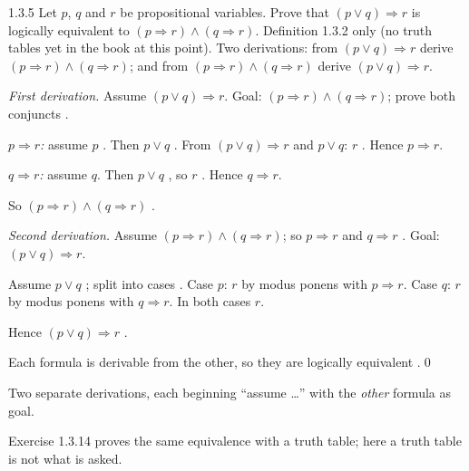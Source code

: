 \begin{bookex}[essential]{1.3.5}
Let $p$, $q$ and $r$ be propositional variables. Prove that $(p\vee q)\Rightarrow r$ is logically equivalent to $(p\Rightarrow r)\wedge(q\Rightarrow r)$.
\solution
\given Definition 1.3.2 only (no truth tables yet in the book at this point).
\goal Two derivations: from $(p\vee q)\Rightarrow r$ derive $(p\Rightarrow r)\wedge(q\Rightarrow r)$; and from $(p\Rightarrow r)\wedge(q\Rightarrow r)$ derive $(p\vee q)\Rightarrow r$.
\begin{steps}
\item \emph{First derivation.} Assume $(p\vee q)\Rightarrow r$. Goal: $(p\Rightarrow r)\wedge(q\Rightarrow r)$; prove both conjuncts .
\item \emph{$p\Rightarrow r$:} assume $p$ . Then $p\vee q$ . From $(p\vee q)\Rightarrow r$ and $p\vee q$: $r$ . Hence $p\Rightarrow r$.
\item \emph{$q\Rightarrow r$:} assume $q$. Then $p\vee q$ , so $r$ . Hence $q\Rightarrow r$.
\item So $(p\Rightarrow r)\wedge(q\Rightarrow r)$ .
\item \emph{Second derivation.} Assume $(p\Rightarrow r)\wedge(q\Rightarrow r)$; so $p\Rightarrow r$ and $q\Rightarrow r$ . Goal: $(p\vee q)\Rightarrow r$.
\item Assume $p\vee q$ ; split into cases . Case $p$: $r$ by modus ponens with $p\Rightarrow r$. Case $q$: $r$ by modus ponens with $q\Rightarrow r$. In both cases $r$.
\item Hence $(p\vee q)\Rightarrow r$ .
\end{steps}
\conclusion Each formula is derivable from the other, so they are logically equivalent .\qed
\begin{compare}
\item Two separate derivations, each beginning ``assume \dots'' with the \emph{other} formula as goal.
\item Exercise 1.3.14 proves the same equivalence with a truth table; here a truth table is not what is asked.
\end{compare}
\end{bookex}

